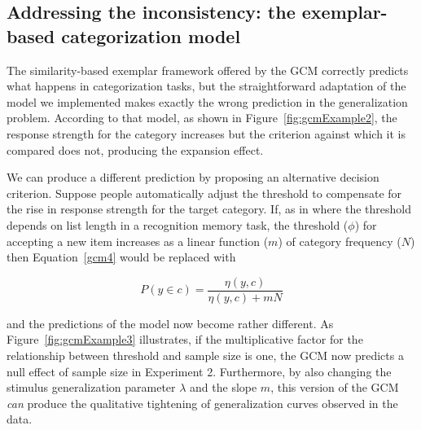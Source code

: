 \documentclass[doc,apacite]{apa6}
\begin{document}

\subsection{Addressing the inconsistency: the exemplar-based categorization model}

The similarity-based exemplar framework offered by the GCM correctly predicts what happens in categorization tasks, but the straightforward adaptation of the model we implemented makes exactly the wrong prediction in the generalization problem. According to that model, as shown in Figure~\ref{fig:gcmExample2}, the response strength for the category increases but the criterion against which it is compared does not, producing the expansion effect.

We can produce a different prediction by proposing an alternative decision criterion. Suppose people automatically adjust the threshold to compensate for the rise in response strength for the target category. If, as in  where the threshold depends on list length in a recognition memory task, the threshold ($\phi$) for accepting a new item increases as a linear function ($m$) of category frequency ($N$) then Equation~\ref{gcm4} would be replaced with

\begin{equation}
\label{gcm5}
P(y \in c) = \frac{\eta(y,c)}{\eta(y,c) + mN}
\end{equation}

\noindent
and the predictions of the model now become rather different. As Figure~\ref{fig:gcmExample3} illustrates, if the multiplicative factor for the relationship between threshold and sample size is one, the GCM now predicts a null effect of sample size in Experiment 2. Furthermore, by also changing the stimulus generalization parameter $\lambda$ and the slope $m$, this version of the GCM {\it can} produce the qualitative tightening of generalization curves observed in the data.

\end{document}
